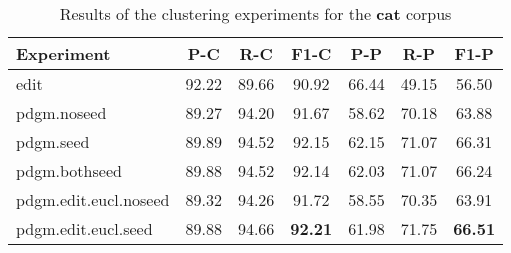 \begin{table}[p]
\begin{center}
\begin{tabular}{lcccccc}
\toprule
\bf Experiment & \bf P-C & \bf R-C & \bf F1-C & \bf P-P & \bf R-P & \bf F1-P\\
\midrule
edit & 92.22 & 89.66 & 90.92 & 66.44 & 49.15 & 56.50\\
pdgm.noseed & 89.27 & 94.20 & 91.67 & 58.62 & 70.18 & 63.88\\
pdgm.seed & 89.89 & 94.52 & 92.15 & 62.15 & 71.07 & 66.31\\
pdgm.bothseed & 89.88 & 94.52 & 92.14 & 62.03 & 71.07 & 66.24\\
pdgm.edit.eucl.noseed & 89.32 & 94.26 & 91.72 & 58.55 & 70.35 & 63.91\\
pdgm.edit.eucl.seed & 89.88 & 94.66 & \bf 92.21 & 61.98 & 71.75 & \bf 66.51\\
\bottomrule
\end{tabular}
\end{center}
\caption{\label{table:res:cat:clust} Results of the clustering experiments for the \textbf{cat} corpus}
\end{table}

